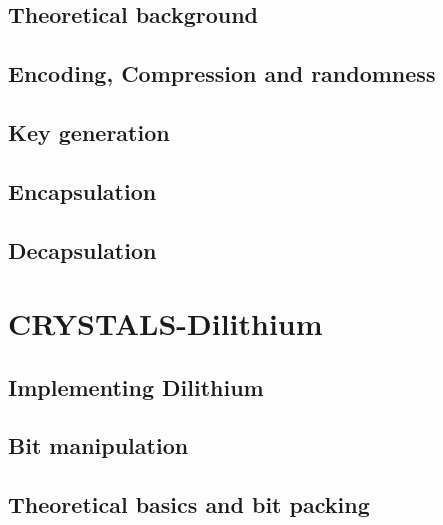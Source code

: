 \section{Theoretical background}
\label{sec:kyber_theroteical}


\section{Encoding, Compression and randomness}
\label{sec:kyber_enc_compr}


\section{Key generation}
\label{sec:kyber_keygen}


\section{Encapsulation}
\label{sec:kyber_enc}


\section{Decapsulation}
\label{sec:kyber_dec}


\chapter{CRYSTALS-Dilithium}
\label{ch:dilithium}


\section{Implementing Dilithium}
\label{sec:implementing_dil}


\section{Bit manipulation}
\label{sec:dil_bit_man}


\section{Theoretical basics and bit packing}
\label{sec:dil_bit_pack}


